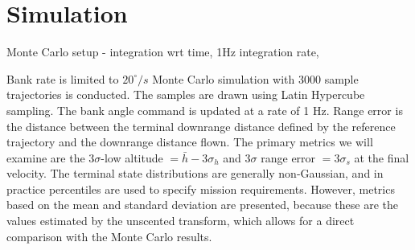 \section{Simulation}
Monte Carlo setup - integration wrt time, 1Hz integration rate, 

Bank rate is limited to $20^{\circ}/s$
Monte Carlo simulation with 3000 sample trajectories is conducted. The samples are drawn using Latin Hypercube sampling. The bank angle command is updated at a rate of 1 Hz. Range error is the distance between the terminal downrange distance defined by the reference trajectory and the downrange distance flown. The primary metrics we will examine are the 3$\sigma$-low altitude $=\bar{h}-3\sigma_h$ and 3$\sigma$ range error $= 3\sigma_s$ at the final velocity. The terminal state distributions are generally non-Gaussian, and in practice percentiles are used to specify mission requirements. However, metrics based on the mean and standard deviation are presented, because these are the values estimated by the unscented transform, which allows for a direct comparison with the Monte Carlo results.

